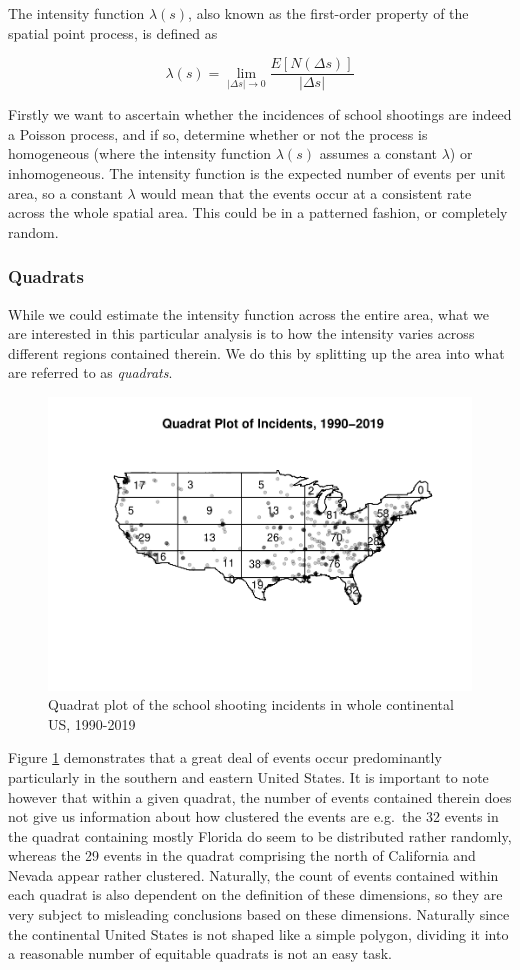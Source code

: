 \documentclass[12pt]{article}
\begin{document}
The intensity function \(\lambda(s)\), also known as the first-order property of the spatial point process, is defined as

\[\lambda(s) = \lim_{|\Delta s| \to 0} \frac{E[N(\Delta s)]}{| \Delta s|}\]

Firstly we want to ascertain whether the incidences of school shootings are indeed a Poisson process, and if so, determine whether or not the process is homogeneous (where the intensity function \(\lambda(s)\) assumes a constant \(\lambda\)) or inhomogeneous. The intensity function is the expected number of events per unit area, so a constant \(\lambda\) would mean that the events occur at a consistent rate across the whole spatial area. This could be in a patterned fashion, or completely random.

\hypertarget{quadrats}{%
\subsubsection{Quadrats}\label{quadrats}}

While we could estimate the intensity function across the entire area, what we are interested in this particular analysis is to how the intensity varies across different regions contained therein. We do this by splitting up the area into what are referred to as \emph{quadrats}.

\begin{figure}
\includegraphics[width=0.65\linewidth,style="float:right; padding:10px]{JStevenRaquel_STATS295_Final_files/figure-latex/plot-quadrats-1990-2019-1} \caption{Quadrat plot of the school shooting incidents in whole continental US, 1990-2019}\label{fig:plot-quadrats-1990-2019}
\end{figure}

Figure \ref{fig:plot-quadrats-1990-2019} demonstrates that a great deal of events occur predominantly particularly in the southern and eastern United States. It is important to note however that within a given quadrat, the number of events contained therein does not give us information about how clustered the events are e.g.~the 32 events in the quadrat containing mostly Florida do seem to be distributed rather randomly, whereas the 29 events in the quadrat comprising the north of California and Nevada appear rather clustered. Naturally, the count of events contained within each quadrat is also dependent on the definition of these dimensions, so they are very subject to misleading conclusions based on these dimensions. Naturally since the continental United States is not shaped like a simple polygon, dividing it into a reasonable number of equitable quadrats is not an easy task.
\end{document}
